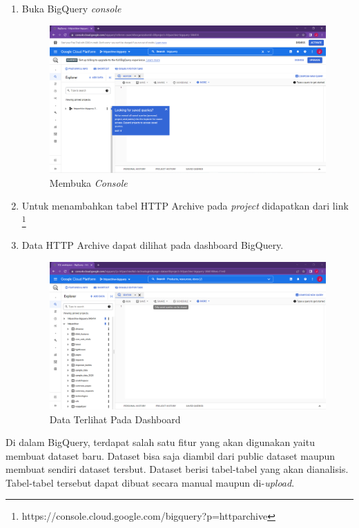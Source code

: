 \begin{enumerate}
	\item Buka BigQuery \textit{console} 
	\begin{figure}[H]
		\centering  
		\includegraphics[scale=0.35]{Gambar/bq_workspace.PNG}  
		\caption{Membuka \textit{Console}} 
		\label{fig:create_project} 
	\end{figure}
	
	\item Untuk menambahkan tabel HTTP Archive pada \textit{project} didapatkan dari link \footnote{https://console.cloud.google.com/bigquery?p=httparchive}
	
	
	\item Data HTTP Archive dapat dilihat pada dashboard BigQuery.
	\begin{figure}[H]
		\centering  
		\includegraphics[scale=0.35]{Gambar/BG-Dashboard.PNG}  
		\caption{Data Terlihat Pada Dashboard} 
		\label{fig:BQ-Dashboard} 
	\end{figure}
\end{enumerate}

Di dalam BigQuery, terdapat salah satu fitur yang akan digunakan yaitu membuat dataset baru. Dataset bisa saja diambil dari public dataset maupun membuat sendiri dataset tersbut. Dataset berisi tabel-tabel yang akan dianalisis. Tabel-tabel tersebut dapat dibuat secara manual maupun di-\textit{upload}.

